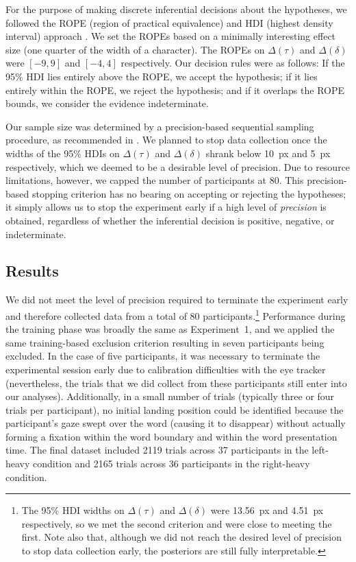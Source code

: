 \documentclass[doc,biblatex]{apa7}
\begin{document}
For the purpose of making discrete inferential decisions about the hypotheses, we followed the ROPE (region of practical equivalence) and HDI (highest density interval) approach \parencite{Kruschke:2015}. We set the ROPEs based on a minimally interesting effect size (one quarter of the width of a character). The ROPEs on $\Delta(\tau)$ and $\Delta(\delta)$ were $[-9, 9]$ and $[-4, 4]$ respectively. Our decision rules were as follows: If the 95\% HDI lies entirely above the ROPE, we accept the hypothesis; if it lies entirely within the ROPE, we reject the hypothesis; and if it overlaps the ROPE bounds, we consider the evidence indeterminate.

Our sample size was determined by a precision-based sequential sampling procedure, as recommended in \textcite{Kruschke:2015}. We planned to stop data collection once the widths of the 95\% HDIs on $\Delta(\tau)$ and $\Delta(\delta)$ shrank below 10~px and 5~px respectively, which we deemed to be a desirable level of precision. Due to resource limitations, however, we capped the number of participants at 80. This precision-based stopping criterion has no bearing on accepting or rejecting the hypotheses; it simply allows us to stop the experiment early if a high level of \textit{precision} is obtained, regardless of whether the inferential decision is positive, negative, or indeterminate.

\subsection{Results}

We did not meet the level of precision required to terminate the experiment early and therefore collected data from a total of 80 participants.\footnote{The 95\% HDI widths on $\Delta(\tau)$ and $\Delta(\delta)$ were 13.56~px and 4.51~px respectively, so we met the second criterion and were close to meeting the first. Note also that, although we did not reach the desired level of precision to stop data collection early, the posteriors are still fully interpretable.} Performance during the training phase was broadly the same as Experiment~1, and we applied the same training-based exclusion criterion resulting in seven participants being excluded. In the case of five participants, it was necessary to terminate the experimental session early due to calibration difficulties with the eye tracker (nevertheless, the trials that we did collect from these participants still enter into our analyses). Additionally, in a small number of trials (typically three or four trials per participant), no initial landing position could be identified because the participant's gaze swept over the word (causing it to disappear) without actually forming a fixation within the word boundary and within the word presentation time. The final dataset included 2119 trials across 37 participants in the left-heavy condition and 2165 trials across 36 participants in the right-heavy condition.
\end{document}
